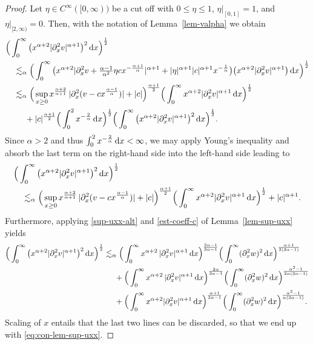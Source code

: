 \documentclass[reqno,12pt]{amsart}
\renewcommand{\d}{\ensuremath{\mathrm{d}}}
\renewcommand{\d}{\ensuremath{{\rm d}}}
\numberwithin{equation}{section}
\begin{document}
\begin{proof}
Let $\eta \in C^\infty([0,\infty))$ be a cut off with $0 \le \eta \le 1$, $\eta|_{[0,1]} = 1$, and $\eta|_{[2,\infty)} = 0$. Then, with the notation of Lemma~\ref{lem-valpha} we obtain
%
\begin{align*}
   &\Big( \int_0^\infty \big(x^{\alpha+2} |\partial_x^2 v|^{\alpha +1}\big)^2 \, \d x\Big)^{\frac{1}{2}} 
   \\
   &\quad\lesssim_\alpha 
   \Big( \int_0^\infty \big(x^{\alpha+2} |\partial_x^2 v + \tfrac{\alpha-1}{\alpha^2} \eta c x^{- \frac{\alpha+1}{\alpha}}|^{\alpha +1} + |\eta|^{\alpha+1} |c|^{\alpha+1} x^{-\frac 1 \alpha}\big) \big(x^{\alpha+2} |\partial_x^2 v|^{\alpha +1}\big) \, \d x\Big)^{\frac{1}{2}} 
   \\
   &\quad\lesssim_\alpha 
   \Big( \sup_{x\geq 0} x^{\frac{\alpha+2}{\alpha+1}} \, |\partial_x^2 (v - c x^{\frac{\alpha-1}{\alpha}})| + |c|\Big)^{\frac{\alpha +1}{2}} \Big( \int_0^\infty x^{\alpha+2} |\partial_x^2 v|^{\alpha +1} \, \d x\Big)^{\frac{1}{2}} 
   \\
   &\quad \phantom{\lesssim_\alpha} + |c|^{\frac{\alpha+1}{2}} \Big(\int_0^2 x^{-\frac 2 \alpha} \, \d x\Big)^{\frac 1 2} 
   \Big(\int_0^\infty \big(x^{\alpha+2} |\partial_x^2 v|^{\alpha +1}\big)^2 \, \d x\Big)^{\frac{1}{2}}.
\end{align*}
%
Since $\alpha > 2$ and thus $\int_0^2 x^{- \frac 2 \alpha} \, \d x < \infty$, we may apply Young's inequality and absorb the last term on the right-hand side into the left-hand side leading to
%
\begin{align*}
    &\Big( \int_0^\infty \big(x^{\alpha+2} |\partial_x^2 v|^{\alpha +1}\big)^2 \, \d x\Big)^{\frac{1}{2}} \\
    & \quad \lesssim_\alpha 
    \Big( \sup_{x\geq 0} x^{\frac{\alpha+2}{\alpha+1}} \, |\partial_x^2 (v - c x^{\frac{\alpha-1}{\alpha}})| + |c|\Big)^{\frac{\alpha +1}{2}} \Big( \int_0^\infty x^{\alpha+2} |\partial_x^2 v|^{\alpha +1} \, \d x\Big)^{\frac{1}{2}} + |c|^{\alpha+1}.
\end{align*}
%
Furthermore, applying \eqref{sup-uxx-alt} and \eqref{est-coeff-c} of Lemma~\ref{lem-sup-uxx} yields
%
\begin{align*}
    \Big( \int_0^\infty \big(x^{\alpha+2} |\partial_x^2 v|^{\alpha +1}\big)^2 \, \d x\Big)^{\frac{1}{2}}
    &\lesssim_{\alpha}
    \Big( \int_0^\infty x^{\alpha +2} \, |\partial_x^2 v|^{\alpha +1} \, \d x\Big)^{\frac{2\alpha-1}{3\alpha-1}} 
    \Big( \int_0^\infty (\partial_x^2 w)^2 \, \d x\Big)^{\frac{\alpha+1}{2(3\alpha-1)}} \\
    &\phantom{\lesssim_\alpha}
    + \Big( \int_0^\infty x^{\alpha +2}\, |\partial_x^2 v|^{\alpha +1}\, \d x\Big)^{\frac{2\alpha}{3\alpha-1}} 
    \Big( \int_0^\infty (\partial_x^2 w)^2 \, \d x\Big)^{\frac{\alpha^2-1}{2\alpha(3\alpha-1)}} 
    \\
    &\phantom{\lesssim_\alpha} + \Big(\int_0^\infty x^{\alpha+2} |\partial_x^2 v|^{\alpha+1} \, \d x\Big)^{\frac{\alpha+1}{3\alpha-1}} 
    \Big(\int_0^\infty (\partial_x^2 w)^2 \, \d x\Big)^{\frac{\alpha^2-1}{\alpha(3\alpha-1)}}.
\end{align*}
%
Scaling of $x$ entails that the last two lines can be discarded, so that we end up with \eqref{eq:con-lem-sup-uxx}.
\end{proof}
\end{document}

